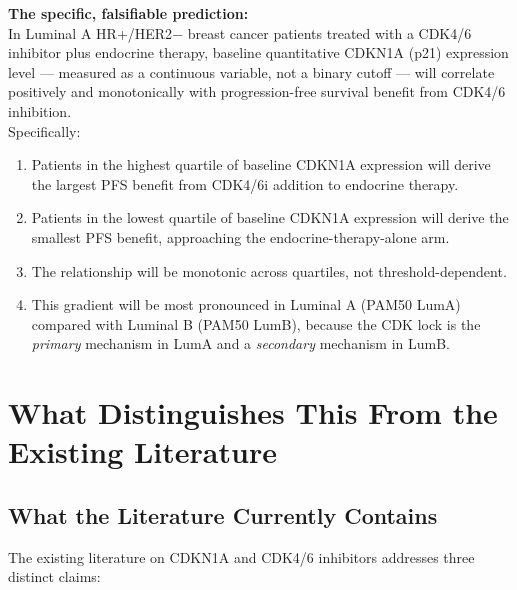 \documentclass[12pt, a4paper]{article}
\begin{document}
\begin{center}
\colorbox{findingbox}{
\begin{minipage}{0.88\textwidth}
\vspace{0.6em}
\textbf{The specific, falsifiable prediction:}\\[0.5em]
In Luminal A HR+/HER2$-$ breast cancer patients treated
with a CDK4/6 inhibitor plus endocrine therapy, baseline
quantitative CDKN1A (p21) expression level --- measured
as a continuous variable, not a binary cutoff --- will
correlate positively and monotonically with progression-free
survival benefit from CDK4/6 inhibition.\\[0.4em]
Specifically:
\begin{enumerate}[leftmargin=*, itemsep=3pt]
    \item Patients in the highest quartile of baseline
    CDKN1A expression will derive the largest PFS benefit
    from CDK4/6i addition to endocrine therapy.
    \item Patients in the lowest quartile of baseline
    CDKN1A expression will derive the smallest PFS benefit,
    approaching the endocrine-therapy-alone arm.
    \item The relationship will be monotonic across
    quartiles, not threshold-dependent.
    \item This gradient will be most pronounced in
    Luminal A (PAM50 LumA) compared with Luminal B
    (PAM50 LumB), because the CDK lock is the
    \emph{primary} mechanism in LumA and a
    \emph{secondary} mechanism in LumB.
\end{enumerate}
\vspace{0.4em}
\end{minipage}}
\end{center}

\section{What Distinguishes This From the Existing Literature}

\subsection{What the Literature Currently Contains}

The existing literature on CDKN1A and CDK4/6 inhibitors
addresses three distinct claims:
\end{document}
